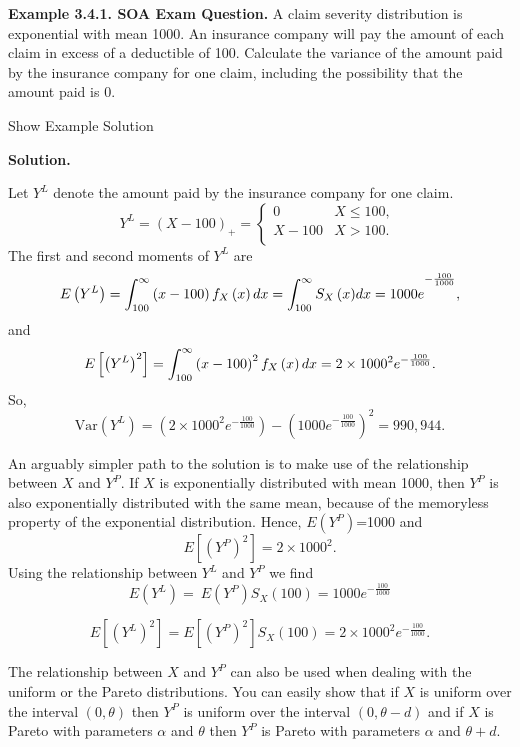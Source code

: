 \documentclass[]{book}
\theoremstyle{definition}
\theoremstyle{definition}
\theoremstyle{definition}
\theoremstyle{remark}
\begin{document}
\textbf{Example 3.4.1. SOA Exam Question.} A claim severity distribution
is exponential with mean 1000. An insurance company will pay the amount
of each claim in excess of a deductible of 100. Calculate the variance
of the amount paid by the insurance company for one claim, including the
possibility that the amount paid is 0.

Show Example Solution

\hypertarget{toggleExampleLoss.4.1}{}
\textbf{Solution.}

Let \(Y^{L}\) denote the amount paid by the insurance company for one
claim. \[Y^{L} = \left( X - 100 \right)_{+} = \left\{ \begin{matrix}
0 & X \leq 100, \\
X - 100 & X > 100. \\
\end{matrix} \right.\ \] The first and second moments of \(Y^{L}\) are
\[E\left( Y^{L} \right) = \int_{100}^{\infty}\left( x - 100 \right)f_{X}\left( x \right)dx \\
= {\int_{100}^{\infty}{S_{X}\left( x \right)}dx = 1000e}^{- \frac{100}{1000}},\]
and
\[E\left\lbrack \left( Y^{L} \right)^{2} \right\rbrack = \int_{100}^{\infty}\left( x - 100 \right)^{2}f_{X}\left( x \right)dx \\\\
= 2 \times 1000^{2}e^{- \frac{100}{1000}}.\] So,
\[\mathrm{Var}\left( Y^{L} \right) = \left( 2 \times 1000^{2}e^{- \frac{100}{1000}} \right) - \left( {1000e}^{- \frac{100}{1000}} \right)^{2} = 990,944.\]

An arguably simpler path to the solution is to make use of the
relationship between \(X\) and \(Y^{P}\). If \(X\) is exponentially
distributed with mean 1000, then \(Y^{P}\) is also exponentially
distributed with the same mean, because of the memoryless property of
the exponential distribution. Hence, \(E\left( Y^{P} \right)\)=1000 and
\[E\left\lbrack \left( Y^{P} \right)^{2} \right\rbrack = 2 \times 1000^{2}.\]
Using the relationship between \(Y^{L}\) and \(Y^{P}\) we find
\[E\left( Y^{L} \right) = \ E\left( Y^{P} \right)S_{X}\left( 100 \right){= 1000e}^{- \frac{100}{1000}}\]

\[E\left\lbrack \left( Y^{L} \right)^{2} \right\rbrack = E\left\lbrack \left( Y^{P} \right)^{2} \right\rbrack S_{X}\left( 100 \right) = 2 \times 1000^{2}e^{- \frac{100}{1000}}.\]

The relationship between \(X\) and \(Y^P\) can also be used when dealing
with the uniform or the Pareto distributions. You can easily show that
if \(X\) is uniform over the interval \(\left(0,\theta\right)\) then
\(Y^P\) is uniform over the interval \(\left(0,\theta-d\right)\) and if
\(X\) is Pareto with parameters \(\alpha\) and \(\theta\) then \(Y^P\)
is Pareto with parameters \(\alpha\) and \(\theta+d\).
\end{document}
